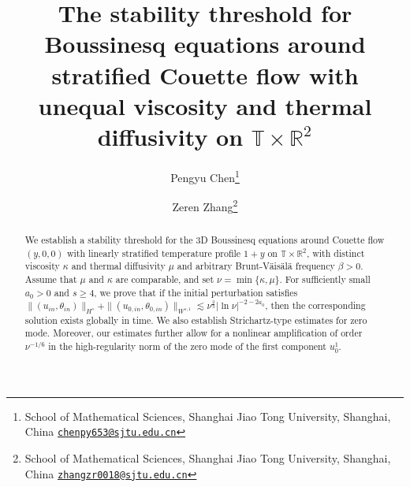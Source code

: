 \documentclass[12pt]{article}
\author{Pengyu Chen\thanks{School of Mathematical Sciences, Shanghai Jiao Tong University, Shanghai, China \href{mailto:fwang256@sjtu.edu.cn}{\texttt{chenpy653@sjtu.edu.cn}}} \and Zeren Zhang\thanks{School of Mathematical Sciences, Shanghai Jiao Tong University, Shanghai, China \href{mailto:zhangzr0018@sjtu.edu.cn}{\texttt{zhangzr0018@sjtu.edu.cn}}}}
\title{The stability threshold for Boussinesq equations around stratified Couette flow with unequal
viscosity and thermal diffusivity on $\mathbb{T}\times\mathbb{R}^2$ }
\date{}
\numberwithin{equation}{section}
\begin{document}
    \maketitle
    \begin{abstract}
		We establish a stability threshold for the 3D Boussinesq equations around Couette flow $(y,0,0)$ with linearly stratified temperature profile $1+y$ on $\mathbb{T}\times\mathbb{R}^2$, with distinct viscosity $\kappa$ and thermal diffusivity $\mu$ and arbitrary Brunt-V\"ais\"al\"a frequency $\beta>0$. Assume that $\mu$ and $\kappa$ are comparable, and set $\nu=\min\{\kappa,\mu\}$. For sufficiently small \(a_0>0\) and \(s\geq4\), we prove that if the initial perturbation satisfies $\|(u_{in},\theta_{in})\|_{H^s}+\|(u_{0,in},\theta_{0,in})\|_{W^{s,1}}\lesssim\nu^{\frac{2}{3}} |\ln{\nu}|^{-2-2a_0}$, then the corresponding solution exists globally in time. We also establish Strichartz-type estimates for zero mode. Moreover, our estimates further allow for a nonlinear amplification of order $\nu^{-1/6}$ in the high-regularity norm of the zero mode of the first component $u^1_0$.
	\end{abstract}
\end{document}
